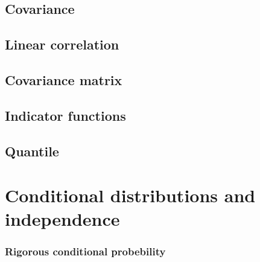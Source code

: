 \documentclass{report}
\begin{document}
	\section{Covariance}
	\section{Linear correlation}
	\section{Covariance matrix}
	\section{Indicator functions}
	\section{Quantile}
	
	\chapter{Conditional distributions and independence}
	\subsection{Rigorous conditional probebility}
	
\end{document}
